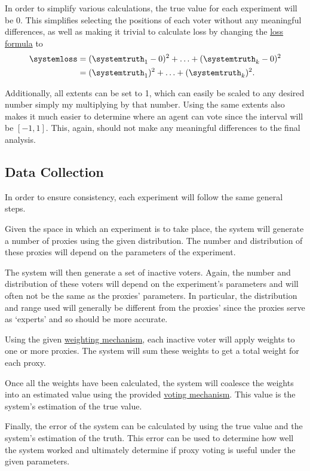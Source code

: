 In order to simplify various calculations, the true value for each experiment
will be 0.
This simplifies selecting the positions of each voter without any meaningful
differences, as well as making it trivial to calculate loss by changing the
\hyperref[eq:loss]{loss formula} to
\begin{align}
    \systemloss &=
    (\systemtruth_1 - 0)^2 +
    \mathellipsis +
    (\systemtruth_k - 0)^2
    \nonumber \\
    &=
    (\systemtruth_1)^2 +
    \mathellipsis +
    (\systemtruth_k )^2
    \text{.}\label{eq:adjusted-loss}
\end{align}

Additionally, all extents can be set to 1, which can easily be scaled to any
desired number simply my multiplying by that number.
Using the same extents also makes it much easier to determine where an agent
can vote since the interval will be $[-1, 1]$.
This, again, should not make any meaningful differences to the final analysis.

\subsection{Data Collection}\label{subsec:data-collection}
In order to ensure consistency, each experiment will follow the same general
steps.

\begin{enumerate}[label=\textbf{\arabic*}., leftmargin=2\parindent]
    Given the space in which an experiment is to take place, the system will
    generate a number of proxies using the given distribution.
    The number and distribution of these proxies will depend on the
    parameters of the experiment.

    The system will then generate a set of inactive voters.
    Again, the number and distribution of these voters will depend on the
    experiment's parameters and will often not be the same as the proxies'
    parameters.
    In particular, the distribution and range used will generally be
    different from the proxies' since the proxies serve as `experts' and so
    should be more accurate.

    Using the given \hyperref[subsec:weighting-mechanisms]{weighting mechanism},
    each inactive voter will apply weights to one or more proxies.
    The system will sum these weights to get a total weight for each proxy.

    Once all the weights have been calculated, the system will coalesce
    the weights into an estimated value using the provided
    \hyperref[subsec:voting-mechanisms]{voting mechanism}.
    This value is the system's estimation of the true value.

    Finally, the error of the system can be calculated by using the true
    value and the system's estimation of the truth.
    This error can be used to determine how well the system worked and
    ultimately determine if proxy voting is useful under the given parameters.
\end{enumerate}

